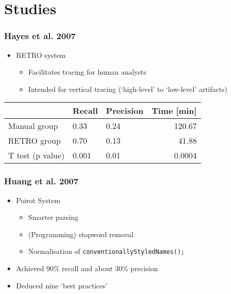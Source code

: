 \documentclass{beamer}
\begin{document}

\section{Studies}
\begin{frame}
\frametitle{Hayes et al. 2007}
\begin{itemize}
\item RETRO system
  \begin{itemize}
  \item Facilitates tracing for human analysts
  \item Intended for vertical tracing (`high-level' to `low-level' artifacts)
  \end{itemize}
\end{itemize}

\begin{table}
\begin{tabular}{l||l|l|r|}
  &Recall&Precision&Time [min]\\\hline\hline
  Manual group&0.33&0.24&120.67\\\hline
  RETRO group&0.70&0.13&41.88\\\hline
  T test (p value)&0.001&0.01&0.0004\\\hline
\end{tabular}
\end{table}

\end{frame}


\begin{frame}
\frametitle{Huang et al. 2007}
\begin{itemize}
\item Poirot System
  \begin{itemize}
  \item Smarter parsing
  \item (Programming) stopword removal
  \item Normalisation of {\tt conventionallyStyledNames();}
  \end{itemize}
\item Achieved 90\% recall and about 30\% precision
\item Deduced nine `best practices'
\end{itemize}
\end{frame}
\end{document}
